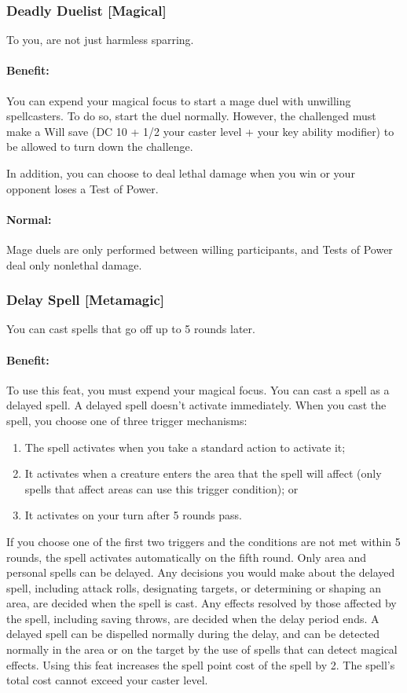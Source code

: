 \subsubsection[Deadly Duelist]{Deadly Duelist [Magical]}
\label{Feat:DeadlyDuelist}
To you,  are not just harmless sparring.

\paragraph{Benefit:} You can expend your magical focus to start a mage duel with unwilling spellcasters. To do so, start the duel normally. However, the challenged must make a Will save (DC 10 + 1/2 your caster level + your key ability modifier) to be allowed to turn down the challenge.

In addition, you can choose to deal lethal damage when you win or your opponent loses a Test of Power.
\paragraph{Normal:} Mage duels are only performed between willing participants, and Tests of Power deal only nonlethal damage.

\subsubsection[Delay Spell]{Delay Spell [Metamagic]}
\label{Feat:DelaySpell}
You can cast spells that go off up to 5 rounds later.

\paragraph{Benefit:} To use this feat, you must expend your magical focus. 
You can cast a spell as a delayed spell. A delayed spell doesn't activate immediately. 
When you cast the spell, you choose one of three trigger mechanisms: 
\begin{enumerate}
 \item The spell activates when you take a standard action to activate it;
 \item It activates when a creature enters the area that the spell will affect (only spells that affect areas can use this trigger condition); or
 \item It activates on your turn after 5 rounds pass.
\end{enumerate}   
If you choose one of the first two triggers and the conditions are not met within 5 rounds, the spell activates automatically on the fifth round.
Only area and personal spells can be delayed.
Any decisions you would make about the delayed spell, including attack rolls, designating targets, or determining or shaping an area, are decided when the spell is cast. 
Any effects resolved by those affected by the spell, including saving throws, are decided when the delay period ends.
A delayed spell can be dispelled normally during the delay, 
and can be detected normally in the area or on the target by the use of spells that can detect magical effects. 
Using this feat increases the spell point cost of the spell by 2. The spell's total cost cannot exceed your caster level.
